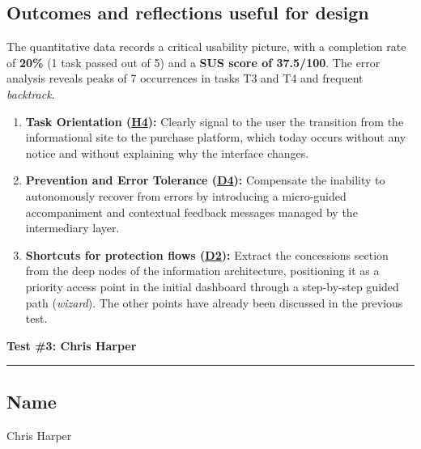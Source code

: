﻿\documentclass[11pt,a4paper]{article}
\begin{document}
\subsection*{Outcomes and reflections useful for design}
\begin{tcolorbox}[base]
The quantitative data records a critical usability picture, with a completion rate of \textbf{20\%} (1 task passed out of 5) and a \textbf{SUS score of 37.5/100}. The error analysis reveals peaks of 7 occurrences in tasks T3 and T4 and frequent \textit{backtrack}.

\medskip
\begin{enumerate}[leftmargin=*]
    \item \textbf{Task Orientation (\hyperref[iss:H4]{H4}):} Clearly signal to the user the transition from the informational site to the purchase platform, which today occurs without any notice and without explaining why the interface changes.
    \item \textbf{Prevention and Error Tolerance (\hyperref[iss:D4]{D4}):} Compensate the inability to autonomously recover from errors by introducing a micro-guided accompaniment and contextual feedback messages managed by the intermediary layer.
    \item \textbf{Shortcuts for protection flows (\hyperref[iss:D2]{D2}):} Extract the concessions section from the deep nodes of the information architecture, positioning it as a priority access point in the initial dashboard through a step-by-step guided path (\textit{wizard}).
    The other points have already been discussed in the previous test.
\end{enumerate}
\end{tcolorbox}


\newpage
\begin{center}
  {\color{primaryColor}\large\bfseries Test \#3: Chris Harper}\\
  \vspace{0.1cm}
  \color{borderColor}\hrule
\end{center}

\vspace{0.5cm}

\subsection*{Name}
\begin{tcolorbox}[base]
Chris Harper
\end{tcolorbox}
\end{document}
